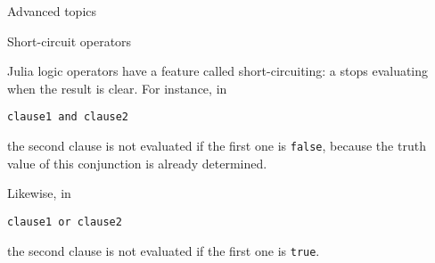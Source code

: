 \begin{comment}
\begin{exercise}
  \label{ex:switch-range}
  Suppose the variable \n{n} is a nonnegative integer. Write a
  \n{switch} statement that has the same effect as:
\begin{lstlisting}
if (n<5)
  cout << "Small" << endl;
else
  cout << "Not small" << endl;
\end{lstlisting}
\end{exercise}

\Level 0 {Scopes}

The true and false branch of a conditional can consist of a single
statement, or of a block in curly brackets. Such a block creates a
%
\emph{scope}\index{scope!in conditional branches}
%
where you can define local variables.

\begin{lstlisting}
if ( something ) {
  int i; 
  .... do something with i
}
// the variable `i' has gone away.
\end{lstlisting}

See chapter~\ref{ch:scope} for more detail.

\begin{slide}{Local variables in conditionals}
  \label{sl:if-scope}
  The curly brackets in a conditional allow you to define local variables:
\begin{lstlisting}
if ( something ) {
  int i; 
  .... do something with i
}
// the variable `i' has gone away.
\end{lstlisting}
Good practice: only define variable where needed.

Braces induce a \indexterm{scope}.
\end{slide}
\end{comment}

 {Advanced topics}

 {Short-circuit operators}

Julia logic operators have a feature called short-circuiting:
a  stops evaluating when the
result is clear. For instance, in
\begin{lstlisting}
clause1 and clause2
\end{lstlisting}
the second clause is not evaluated if the first one is
\lstinline{false}, because the truth value of this conjunction is
already determined.

Likewise, in
\begin{lstlisting}
clause1 or clause2
\end{lstlisting}
the second clause is not evaluated if the first one is \lstinline{true}.

